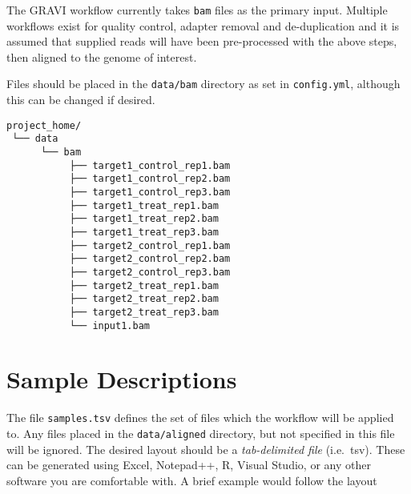 \documentclass[
]{book}
\begin{document}
The GRAVI workflow currently takes \texttt{bam} files as the primary input.
Multiple workflows exist for quality control, adapter removal and de-duplication and it is assumed that supplied reads will have been pre-processed with the above steps, then aligned to the genome of interest.

Files should be placed in the \texttt{data/bam} directory as set in \texttt{config.yml}, although this can be changed if desired.

\begin{verbatim}
project_home/
 └── data
      └── bam 
           ├── target1_control_rep1.bam
           ├── target1_control_rep2.bam
           ├── target1_control_rep3.bam
           ├── target1_treat_rep1.bam
           ├── target1_treat_rep2.bam
           ├── target1_treat_rep3.bam
           ├── target2_control_rep1.bam
           ├── target2_control_rep2.bam
           ├── target2_control_rep3.bam
           ├── target2_treat_rep1.bam
           ├── target2_treat_rep2.bam
           ├── target2_treat_rep3.bam
           └── input1.bam 
\end{verbatim}

\hypertarget{sample-descriptions}{%
\section{Sample Descriptions}\label{sample-descriptions}}

The file \texttt{samples.tsv} defines the set of files which the workflow will be applied to.
Any files placed in the \texttt{data/aligned} directory, but not specified in this file will be ignored.
The desired layout should be a \emph{tab-delimited file} (i.e.~tsv).
These can be generated using Excel, Notepad++, R, Visual Studio, or any other software you are comfortable with.
A brief example would follow the layout
\end{document}
